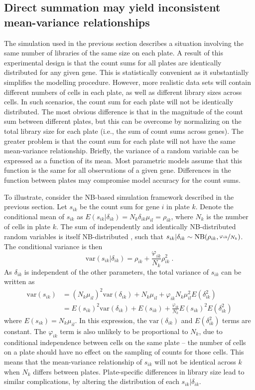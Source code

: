 \documentclass{article}
\begin{document}
\subsection{Direct summation may yield inconsistent mean-variance relationships}
The simulation used in the previous section describes a situation involving the same number of libraries of the same size on each plate.
A result of this experimental design is that the count sums for all plates are identically distributed for any given gene.
This is statistically convenient as it substantially simplifies the modelling procedure.
However, more realistic data sets will contain different numbers of cells in each plate, as well as different library sizes across cells.
In such scenarios, the count sum for each plate will not be identically distributed.
The most obvious difference is that in the magnitude of the count sum between different plates, 
    but this can be overcome by normalizing on the total library size for each plate (i.e., the sum of count sums across genes).
The greater problem is that the count sum for each plate will not have the same mean-variance relationship.
Briefly, the variance of a random variable can be expressed as a function of its mean.
Most parametric models assume that this function is the same for all observations of a given gene.
Differences in the function between plates may compromise model accuracy for the count sums.

To illustrate, consider the NB-based simulation framework described in the previous section.
Let $s_{ik}$ be the count sum for gene $i$ in plate $k$.
Denote the conditional mean of $s_{ik}$ as $E(s_{ik}|\delta_{ik})=N_k \delta_{ik}\mu_{il} = \rho_{ik}$, where $N_k$ is the number of cells in plate $k$.
The sum of independently and identically NB-distributed random variables is itself NB-distributed \cite{robinson2008small}, 
    such that $s_{ik} |\delta_{ik} \sim \mbox{NB}(\rho_{ik}, \nicefrac{\varphi_{ik}}{N_k})$.
The conditional variance is then
\[
    \mbox{var}(s_{ik} |\delta_{ik}) = \rho_{ik} + \frac{\varphi_{ik}}{N_k}\rho_{ik}^2 \;.
\]
As $\delta_{ik}$ is independent of the other parameters, the total variance of $s_{ik}$ can be written as
\begin{align}
    \mbox{var}(s_{ik}) &= (N_k\mu_{il})^2\mbox{var}(\delta_{ik}) + N_k\mu_{il} + \varphi_{ik} N_k\mu_{il}^2 E(\delta_{ik}^2) \\
                       &= E(s_{ik})^2 \mbox{var}(\delta_{ik}) + E(s_{ik}) + \frac{\varphi_{ik}}{N_k} E(s_{ik})^2 E(\delta_{ik}^2) 
    \label{eqn:meanvar}
\end{align}
where $E(s_{ik})=N_k\mu_{il}$. 
In this expression, the $\mbox{var}(\delta_{ik})$ and $E(\delta_{ik}^2)$ terms are constant.
The $\varphi_{ik}$ term is also unlikely to be proportional to $N_k$, due to conditional independence between cells on the same plate 
    -- the number of cells on a plate should have no effect on the sampling of counts for those cells.
This means that the mean-variance relationship of $s_{ik}$ will not be identical across $k$ when $N_k$ differs between plates.
Plate-specific differences in library size lead to similar complications, by altering the distribution of each $s_{ik} |\delta_{ik}$.
\end{document}
